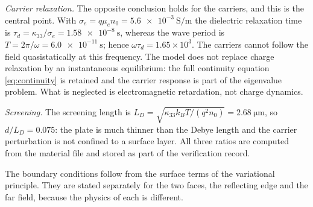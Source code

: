 \emph{Carrier relaxation.}  The opposite conclusion holds for the carriers, and
this is the central point.  With $\sigma_e=q\mu_en_0=\SI{5.6e-3}{\siemens
\per\metre}$ the dielectric relaxation time is
$\tau_d=\kappa_{33}/\sigma_e=\SI{1.58e-8}{\second}$, whereas the wave period is
$T=2\pi/\omega=\SI{6.0e-11}{\second}$; hence $\omega\tau_d=1.65\times10^{3}$.
The carriers cannot follow the field quasistatically at this frequency.  The model does not replace charge relaxation by an instantaneous
equilibrium: the full continuity equation \eqref{eq:continuity} is retained and
the carrier response is part of the eigenvalue problem.  What is neglected is
electromagnetic retardation, not charge dynamics.

\emph{Screening.}  The screening length is $L_D=\sqrt{\kappa_{33}k_BT/(q^2n_0)}
=\SI{2.68}{\micro\metre}$, so $d/L_D=0.075$: the plate is much thinner than the
Debye length and the carrier perturbation is not confined to a surface layer.
All three ratios are computed from the material file and stored as part of the
verification record.


The boundary conditions follow from the surface terms of the variational
principle.  They are stated separately for the two faces, the reflecting edge
and the far field, because the physics of each is different.

